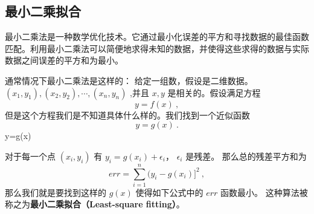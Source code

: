 

\subsection{最小二乘拟合}
最小二乘法是一种数学优化技术。它通过最小化误差的平方和寻找数据的最佳函数匹配。利用最小二乘法可以简便地求得未知的数据，并使得这些求得的数据与实际数据之间误差的平方和为最小。

通常情况下最小二乘法是这样的： 给定一组数，假设是二维数据。$(x_1,y_1),(x_2,y_2),\cdots,(x_n,y_n)$ ,并且 $x,y$ 是相关的。假设满足方程
\begin{equation}
y=f(x)~,
\end{equation}
但是这个方程我们是不知道具体什么样的。我们找到一个近似函数
\begin{equation}
y=g(x)~.
\end{equation}
y=g(x)

对于每一个点 $(x_i,y_i)$ 有 $y_i=g(x_i)+\epsilon_i$， $\epsilon_i$ 是残差。 那么总的残差平方和为
\begin{equation}
err=\sum_{i=1}^n(y_i-g(x_i)]^2~,
\end{equation}
那么我们就是要找到这样的 $g(x)$ 使得如下公式中的 $err$ 函数最小。 这种算法被称之为\textbf{最小二乘拟合（Least-square fitting）}。

